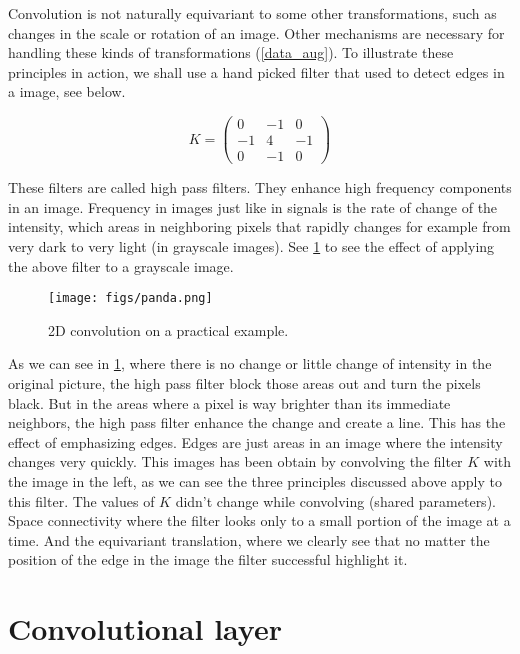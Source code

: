 Convolution is not naturally equivariant to some other transformations, such as changes in the scale or rotation of an image. Other
mechanisms are necessary for handling these kinds of transformations (\cref{data_aug}). To illustrate these principles in action, we shall use a hand picked filter that used to detect edges in a image, see below.

$$
K = \begin{pmatrix}
0  & -1  &  0 \\
-1 &  4  & -1 \\
0  & -1  &  0
\end{pmatrix}
$$

These filters are called high pass filters. They enhance high frequency components in an image. Frequency in images just like in signals is the rate
of change of the intensity, which areas in neighboring pixels that rapidly changes for example from very dark to very light (in grayscale images).
See \cref{fig:filter} to see the effect of applying the above filter to a grayscale image.

\begin{figure}[H]
  \centering
  \texttt{[image: figs/panda.png]}
  \caption[2D convolution on a practical example]{2D convolution on a practical example.}\label{fig:filter}
\end{figure}

As we can see in \cref{fig:filter}, where there is no change or little change of intensity in the original picture, the high pass filter
block those areas out and turn the pixels black. But in the areas where a pixel is way brighter than its immediate neighbors, the high pass filter
enhance the change and create a line. This has the effect of emphasizing edges. Edges are just areas in an image where the intensity changes very
quickly. This images has been obtain by convolving the filter $K$ with the image in the left, as we can see the three principles discussed above
apply to this filter. The values of $K$ didn't change while convolving (shared parameters). Space connectivity where
the filter looks only to a small portion of the image at a time. And the equivariant translation, where we clearly see that no matter the position
of the edge in the image the filter successful highlight it.

\section{Convolutional layer}

